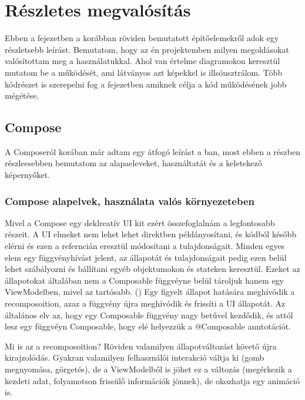 \chapter{Részletes megvalósítás}
\label{sec:Details}

Ebben a fejezetben a korábban röviden bemutatott építőelemekről adok egy részletsebb leírást.
Bemutatom, hogy az én projektemben milyen megoldásokat valósítottam meg a használatukkal.
Ahol van értelme diagramokon keresztül mutatom be a működését, ami látványos azt képekkel is illsóusztrálom.
Több kódrészet is szerepelni fog a fejezetben amiknek célja a kód működésének jobb mégétése.

\section{Compose}
\label{sec:Compose}

A Composeról korában már adtam egy átfogó leírást a ban, most ebben a részben részleesebben bemutatom az alapaeleveket, használtatát és a keletekező képernyőket.

\subsection{Compose alapelvek, használata valós környezeteben}

Mivel a Compose egy deklreatív UI kit ezért összefoglalnám a legfontosabb részeit.
A UI elmeket nem lehet lehet direktben példányosítani, és kódból később elérni és ezen a referncián eresztül módosítani a tulajdonságait.
Minden egyes elem egy függvényhívást jelent, az állapotát és tulajdonságait pedig ezen belül lehet szábályozni és bállítani egyéb objektumokon és stateken keresztül.
Ezeket az állapotokat általában nem a Composable függvéyne belül tároljuk hanem egy ViewModelben, mivel az tartósabb. ()
Egy figyelt állapot hatására meghívódik a recomposoition, azaz a függvény újra meghívódik és frissíti a UI állapotát.
Az általános elv az, hogy egy Composable függvény nagy betűvel kezdődik, és attól lesz egy függvéyn Composable, hogy elé helyezzük a @Composable anntotációt.

Mi is az a recomposoition?
Röviden valamilyen állapotváltozást követő újra kirajzolódás.
Gyakran valamilyen felhasználói interakció váltja ki (gomb megnyomása, görgetés), de a ViewModelből is jöhet ez a változás (megérkezik a kezdeti adat, folyamotson frissülő információk jönnek), de okozhatja egy animáció is.

